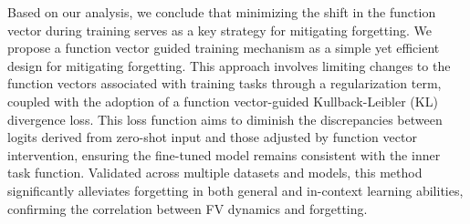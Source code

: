 
Based on our analysis, we conclude that minimizing the shift in the function vector during training serves as a key strategy for mitigating forgetting. We propose a function vector guided training mechanism as a simple yet efficient design for mitigating forgetting. This approach involves limiting changes to the function vectors associated with training tasks through a regularization term, coupled with the adoption of a function vector-guided Kullback-Leibler (KL) divergence loss. This loss function aims to diminish the discrepancies between logits derived from zero-shot input and those adjusted by function vector intervention, ensuring the fine-tuned model remains consistent with the inner task function. Validated across multiple datasets and models, this method significantly alleviates forgetting in both general and in-context learning abilities, confirming the correlation between FV dynamics and forgetting.



